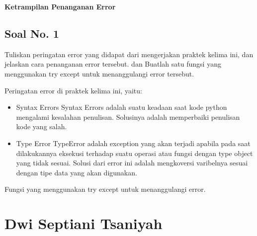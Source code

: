 \hfill \break
{\Large \textbf{Ketrampilan Penanganan Error}}

\subsection{Soal No. 1}
Tuliskan  peringatan  error  yang  didapat  dari  mengerjakan  praktek  kelima  ini, dan  jelaskan  cara  penanganan  error  tersebut.   dan  Buatlah  satu  fungsi  yang menggunakan try except untuk menanggulangi error tersebut.

\hfill \break
Peringatan error di praktek kelima ini, yaitu:
\begin{itemize}
	\item Syntax Errors
	Syntax Errors adalah suatu keadaan saat kode python mengalami kesalahan penulisan. Solusinya adalah memperbaiki penulisan kode yang salah.
		
	\item Type Error
	TypeError adalah exception yang akan terjadi apabila pada saat dilakukannya eksekusi terhadap suatu operasi atau fungsi dengan type object yang tidak sesuai. Solusi dari error ini adalah mengkoversi varibelnya sesuai dengan tipe data yang akan digunakan.
\end{itemize}

\hfill \break
Fungsi yang menggunakan try except untuk menanggulangi error.


\section{Dwi Septiani Tsaniyah}
